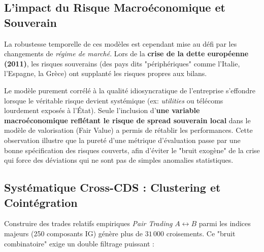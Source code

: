 \subsection{L'impact du Risque Macroéconomique et Souverain}

La robustesse temporelle de ces modèles est cependant mise au défi par les changements de \textit{régime de marché}. Lors de la \textbf{crise de la dette européenne (2011)}, les risques souverains (des pays dits "périphériques" comme l'Italie, l'Espagne, la Grèce) ont supplanté les risques propres aux bilans.

Le modèle purement corrélé à la qualité idiosyncratique de l'entreprise s'effondre lorsque le véritable risque devient systémique (ex: \textit{utilities} ou télécoms lourdement exposés à l'État). 
Seule l'inclusion d'\textbf{une variable macroéconomique reflétant le risque de spread souverain local} dans le modèle de valorisation (Fair Value) a permis de rétablir les performances. Cette observation illustre que la pureté d'une métrique d'évaluation passe par une bonne spécification des risques couverts, afin d'éviter le "bruit exogène" de la crise qui force des déviations qui ne sont pas de simples anomalies statistiques.

\subsection{Systématique Cross-CDS : Clustering et Cointégration}

Construire des trades relatifs empiriques \textit{Pair Trading} $A \leftrightarrow B$ parmi les indices majeurs (250 composants IG) génère plus de $31\,000$ croisements. Ce "bruit combinatoire" exige un double filtrage puissant :

